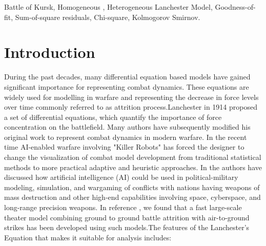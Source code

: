 \documentclass[]{article}
\begin{document}
\begin{keywords}
Battle of Kursk, Homogeneous , Heterogeneous Lanchester Model, Goodness-of-fit,  Sum-of-square residuals, Chi-square, Kolmogorov Smirnov.
\end{keywords}
\newpage


\section{Introduction}
During the past decades, many differential equation based models \autocite{HelmboldRehm:1991,Lanchester:1916,Osipov:1915,Weiss:1975,Schramm:2012} have gained significant importance for representing combat dynamics. These equations are widely used for modelling in warfare and representing the decrease in force levels over time commonly referred to as attrition process.Lanchester in 1914 proposed a set of differential equations, which quantify the importance of force concentration on the battlefield. Many authors have subsequently modified his original work to represent combat dynamics in modern warfare. In the recent time AI-enabled warfare involving "Killer Robots" \autocite{lethalRobots} has forced the designer to change the visualization of combat model development from traditional statistical methods to more practical adaptive and heuristic approaches. In \autocite{Davis2022ArtificialIF} the authors have discussed how artificial intelligence (AI) could be used in political-military modeling, simulation, and wargaming of conflicts with nations having weapons of mass destruction and other high-end capabilities involving space, cyberspace, and long-range precision weapons. In reference \autocite{FATHM:2007}, we found that a fast large-scale theater model combining ground to ground battle attrition with air-to-ground strikes has been developed using such models.The features of the Lanchester's Equation that makes it suitable for analysis includes:
\end{document}
